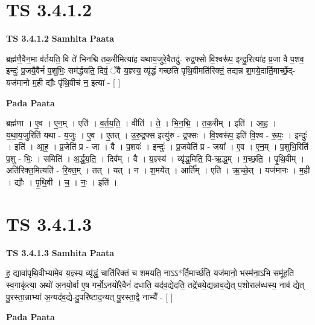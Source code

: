\documentclass[17pt]{extarticle}
\begin{document}
\section*{ TS 3.4.1.2 }

\textbf{TS 3.4.1.2 } \newline
\textbf{Samhita Paata} \newline

ब्रह्म॑णै॒वैन॒मा व॑र्तयति॒ वि ते॑ भिनद्मि तक॒रीमित्या॑ह यथाय॒जुरे॒वैतदु॑- रुद्र॒फ्सो वि॒श्वरू॑प॒ इन्दु॒रित्या॑ह प्र॒जा वै प॒शव॒ इन्दुः॑ प्र॒जयै॒वैनं॑ प॒शुभिः॒ सम॑र्द्धयति॒ दिवं॒ ॅवै य॒ज्ञ्स्य॒ व्यृ॑द्धं गच्छति पृथि॒वीमति॑रिक्तं॒ तद्यन्न श॒मये॒दार्ति॒मार्च्छे॒द्-यज॑मानो म॒ही द्यौः पृ॑थि॒वीच॑ न॒ इत्या॑ - [  ] \newline

\textbf{Pada Paata} \newline

ब्रह्म॑णा । ए॒व । ए॒न॒म् । एति॑ । व॒र्त॒य॒ति॒ । वीति॑ । ते॒ । भि॒न॒द्मि॒ । त॒क॒रीम् । इति॑ । आ॒ह॒ । य॒था॒य॒जुरिति॑ यथा - य॒जुः । ए॒व । ए॒तत् । उ॒रु॒द्र॒फ्स इत्यु॑रु - द्र॒फ्सः । वि॒श्वरू॑प॒ इति॑ वि॒श्व - रू॒पः॒ । इन्दुः॑ । इति॑ । आ॒ह॒ । प्र॒जेति॑ प्र - जा । वै । प॒शवः॑ । इन्दुः॑ । प्र॒जयेति॑ प्र - जया᳚ । ए॒व । ए॒न॒म् । प॒शुभि॒रिति॑ प॒शु - भिः॒ । समिति॑ । अ॒र्द्ध॒य॒ति॒ । दिव᳚म् । वै । य॒ज्ञ्स्य॑ । व्यृ॑द्ध॒मिति॒ वि-ऋ॒द्ध॒म् । ग॒च्छ॒ति॒ । पृ॒थि॒वीम् । अति॑रिक्त॒मित्यति॑ - रि॒क्त॒म् । तत् । यत् । न । श॒मये᳚त् । आर्ति᳚म् । एति॑ । ऋ॒च्छे॒त् । यज॑मानः । म॒ही । द्यौः । पृ॒थि॒वी । च॒ । नः॒ । इति॑ ।  \newline




\section*{ TS 3.4.1.3 }

\textbf{TS 3.4.1.3 } \newline
\textbf{Samhita Paata} \newline

ह॒ द्यावा॑पृथि॒वीभ्या॑मे॒व य॒ज्ञ्स्य॒ व्यृ॑द्धं॒ चाति॑रिक्तं च शमयति॒ नाऽऽ*र्ति॒मार्च्छ॑ति॒ यज॑मानो॒ भस्म॑ना॒ऽभि समू॑हति स्व॒गाकृ॑त्या॒ अथो॑ अ॒नयो॒र्वा ए॒ष गर्भो॒ऽनयो॑रे॒वैनं॑ दधाति॒ यद॑व॒द्येदति॒ तद्रे॑चये॒द्यन्नाव॒द्येत् प॒शोराल॑ब्धस्य॒ नाव॑ द्येत् पु॒रस्ता॒न्नाभ्या॑ अ॒न्यद॑व॒द्ये-दु॒परि॑ष्टाद॒न्यत् पु॒रस्ता॒द्वै नाभ्यै᳚ - [  ] \newline

\textbf{Pada Paata} \newline
\end{document}
